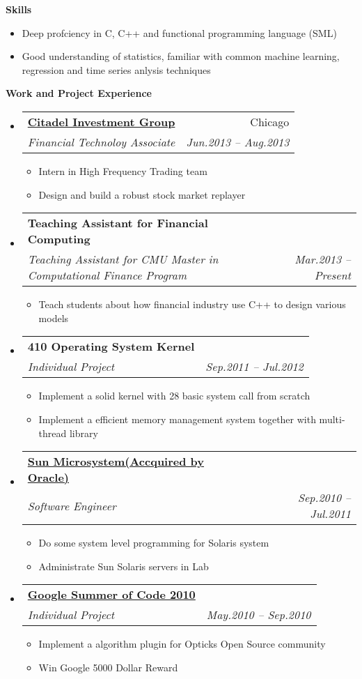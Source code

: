 \documentclass[letterpaper,11pt]{article}
\makeatletter
\newcommand{\resitem}[1]{\item #1 \vspace{-2pt}}
\newcommand{\resheading}[1]{{\large \colorbox{mygrey}{\begin{minipage}{\textwidth}{\textbf{#1 \vphantom{p\^{E}}}}\end{minipage}}}}
\newcommand{\ressubheading}[4]{
\begin{tabular*}{6.5in}{l@{\extracolsep{\fill}}r}
		\textbf{#1} & #2 \\
		\textit{#3} & \textit{#4} \\
\end{tabular*}\vspace{-6pt}}
\makeatother
\begin{document}
\resheading{{Skills}}
  \begin{itemize}
		\item{\small Deep profciency in C, C++ and functional programming language (SML)}
		\item{\small Good understanding of statistics, familiar with common machine learning, regression and time series anlysis techniques}
	\end{itemize}
\resheading{Work and Project Experience}
	\begin{itemize}
    \item
      \ressubheading{\href{http://www.citadel.com}{Citadel Investment Group}}{Chicago}{Financial Technoloy Associate}{Jun.2013 -- Aug.2013}
      { \footnotesize
				\begin{itemize}
					\resitem{Intern in High Frequency Trading team}
          \resitem{Design and build a robust stock market replayer}
				\end{itemize}
			}
    \item 
			\ressubheading{Teaching Assistant for Financial Computing}{}{Teaching Assistant for CMU Master in Computational Finance Program}{Mar.2013 -- Present}
            { \footnotesize
				\begin{itemize}
          \resitem{Teach students about how financial industry use C++ to design various models}
				\end{itemize}
			}
    \item 
			\ressubheading{410 Operating System Kernel}{}{Individual Project}{Sep.2011 -- Jul.2012}
            { \footnotesize
				\begin{itemize}
          \resitem{Implement a solid kernel with 28 basic system call from scratch}
					\resitem{Implement a efficient memory management system together with multi-thread library}
				\end{itemize}
			}
		\item 
			\ressubheading{\href{http://www.oracle.com/us/sun/index.html}{Sun Microsystem(Accquired by Oracle)}}{}{Software Engineer}{Sep.2010 -- Jul.2011}
            { \footnotesize
				\begin{itemize}
					\resitem{Do some system level programming for Solaris system}
					\resitem{Administrate Sun Solaris servers in Lab}
				\end{itemize}
			}
		\item 
            \ressubheading{\href{http://code.google.com/soc/}{Google Summer of Code 2010}}{}{Individual Project}{May.2010 -- Sep.2010}
				{ \footnotesize
				\begin{itemize}
					\resitem{Implement a algorithm plugin for Opticks Open Source community}
                    \resitem{Win Google 5000 Dollar Reward}
				\end{itemize}
				}
	\end{itemize}  %
\end{document}
